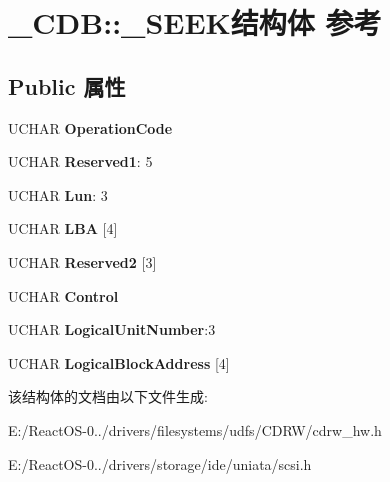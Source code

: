 \hypertarget{struct___c_d_b_1_1___s_e_e_k}{}\section{\+\_\+\+C\+DB\+:\+:\+\_\+\+S\+E\+E\+K结构体 参考}
\label{struct___c_d_b_1_1___s_e_e_k}
\subsection*{Public 属性}
\begin{DoxyCompactItemize}
\item 
\mbox{\label{struct___c_d_b_1_1___s_e_e_k_a6c4b5142c9a2bbe897dc2905f1009946}} 
U\+C\+H\+AR {\bfseries Operation\+Code}
\item 
\mbox{\label{struct___c_d_b_1_1___s_e_e_k_a7fab91ca7b9e4a4aaaac3b58bf978a95}} 
U\+C\+H\+AR {\bfseries Reserved1}\+: 5
\item 
\mbox{\label{struct___c_d_b_1_1___s_e_e_k_ad5d3088000e45ca3e92df8e4181eeb07}} 
U\+C\+H\+AR {\bfseries Lun}\+: 3
\item 
\mbox{\label{struct___c_d_b_1_1___s_e_e_k_ac800a2c2e1b6ef382d3d6f725d717358}} 
U\+C\+H\+AR {\bfseries L\+BA} \mbox{[}4\mbox{]}
\item 
\mbox{\label{struct___c_d_b_1_1___s_e_e_k_a9ade5957d77895abb75db14cd8286204}} 
U\+C\+H\+AR {\bfseries Reserved2} \mbox{[}3\mbox{]}
\item 
\mbox{\label{struct___c_d_b_1_1___s_e_e_k_a4fd77bc0f489bb789c61e37a056ee21d}} 
U\+C\+H\+AR {\bfseries Control}
\item 
\mbox{\label{struct___c_d_b_1_1___s_e_e_k_af4b793c520dd8a05bffbceee5ce22477}} 
U\+C\+H\+AR {\bfseries Logical\+Unit\+Number}\+:3
\item 
\mbox{\label{struct___c_d_b_1_1___s_e_e_k_a56e4e93a32e107d14dcbce13ce082466}} 
U\+C\+H\+AR {\bfseries Logical\+Block\+Address} \mbox{[}4\mbox{]}
\end{DoxyCompactItemize}


该结构体的文档由以下文件生成\+:\begin{DoxyCompactItemize}
\item 
E\+:/\+React\+O\+S-\/0../drivers/filesystems/udfs/\+C\+D\+R\+W/cdrw\+\_\+hw.\+h\item 
E\+:/\+React\+O\+S-\/0../drivers/storage/ide/uniata/scsi.\+h\end{DoxyCompactItemize}
